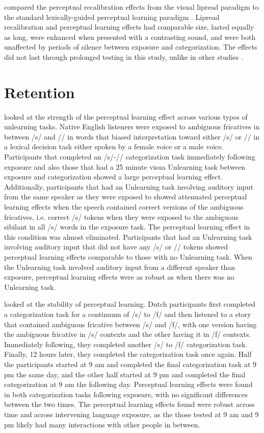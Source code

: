 \citet{vanLinden2007} compared the perceptual recalibration effects from the visual lipread paradigm \citep{Bertelson2003} to the standard lexically-guided perceptual learning paradigm \citep{Norris2003}.  
Lipread recalibration and perceptual learning effects had comparable size, lasted equally as long, were enhanced when presented with a contrasting sound, and were both unaffected by periods of silence between exposure and categorization.  
The effects did not last through prolonged testing in this study, unlike in other studies \citep{Kraljic2005,Eisner2006}.


\section{Retention}
\label{sec:retention}

\citet{Kraljic2005} looked at the strength of the perceptual learning effect across various types of unlearning tasks. 
 Native English listeners were exposed to ambiguous fricatives in between /s/ and /\textesh/ in words that biased interpretation toward either /s/ or /\textesh/ in a lexical decision task either spoken by a female voice or a male voice.
 Participants that completed an /s/-/\textesh/ categorization task immediately following exposure and also those that had a 25 minute visua Unlearning task between exposure and categorization showed a large perceptual learning effect.  
Additionally, participants that had an Unlearning task involving auditory input from the same speaker as they were exposed to showed attenuated perceptual learning effects when the speech contained correct versions of the ambiguous fricatives, i.e. correct /s/ tokens when they were exposed to the ambiguous sibilant in all /s/ words in the exposure task.  
The perceptual learning effect in this condition was almost eliminated. 
 Participants that had an Unlearning task involving auditory input that did not have any /s/ or /\textesh/ tokens showed perceptual learning effects comparable to those with no Unlearning task.  
When the Unlearning task involved auditory input from a different speaker than exposure, perceptual learning effects were as robust as when there was no Unlearning task.

\citet{Eisner2006} looked at the stability of perceptual learning. 
Dutch participants first completed a categorization task for a continuum of /s/ to /f/ and then listened to a story that contained ambiguous fricative between /s/ and /f/, with one version having the ambiguous fricative in /s/ contexts and the other having it in /f/ contexts.
Immediately following, they completed another /s/ to /f/ categorization task.  
Finally, 12 hours later, they completed the categorization task once again.
Half the participants started at 9 am and completed the final categorization task at 9 pm the same day, and the other half started at 9 pm and completed the final categorization at 9 am the following day.
Perceptual learning effects were found in both categorization tasks following exposure, with no significant differences between the two times. 
 The perceptual learning effects found were robust across time and across intervening language exposure, as the those tested at 9 am and 9 pm likely had many interactions with other people in between.

